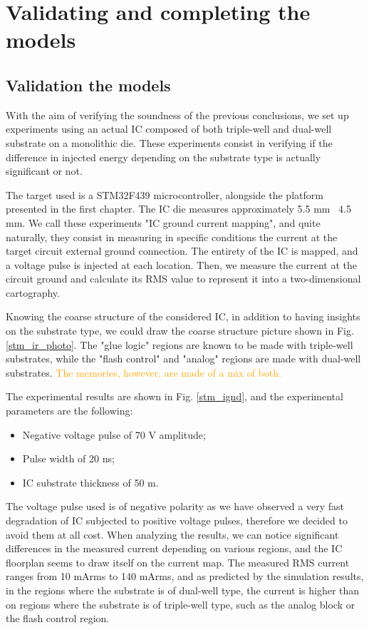 
\section{Validating and completing the models}
\subsection{Validation the models}
	With the aim of verifying the soundness of the previous conclusions, we set up experiments using an actual IC composed of both triple-well and dual-well substrate on a monolithic die.
	These experiments consist in verifying if the difference in injected energy depending on the substrate type is actually significant or not.

	The target used is a STM32F439 microcontroller, alongside the platform presented in the first chapter.
	The IC die measures approximately 5.5 mm \texttimes\ 4.5 mm.
	We call these experiments "IC ground current mapping", and quite naturally, they consist in measuring in specific conditions the current at the target circuit external ground connection.
	The entirety of the IC is mapped, and a voltage pulse is injected at each location.
	Then, we measure the current at the circuit ground and calculate its RMS value to represent it into a two-dimensional cartography.
	
	Knowing the coarse structure of the considered IC, in addition to having insights on the substrate type, we could draw the coarse structure picture shown in Fig. \ref{stm_ir_photo}.
	The "glue logic" regions are known to be made with triple-well substrates, while the "flash control" and "analog" regions are made with dual-well substrates.
	\textcolor{orange}{The memories, however, are made of a mix of both.}
	
	The experimental results are shown in Fig. \ref{stm_ignd}, and the experimental parameters are the following:
	\begin{itemize}
		\item Negative voltage pulse of 70 V amplitude;
		\item Pulse width of 20 ns;
		\item IC substrate thickness of 50 \textmu m.
	\end{itemize}
	The voltage pulse used is of negative polarity as we have observed a very fast degradation of IC subjected to positive voltage pulses, therefore we decided to avoid them at all cost.
	When analyzing the results, we can notice significant differences in the measured current depending on various regions, and the IC floorplan seems to draw itself on the current map.
	The measured RMS current ranges from 10 mArms to 140 mArms, and as predicted by the simulation results, in the regions where the substrate is of dual-well type, the current is higher than on regions where the substrate is of triple-well type, such as the analog block or the flash control region.

